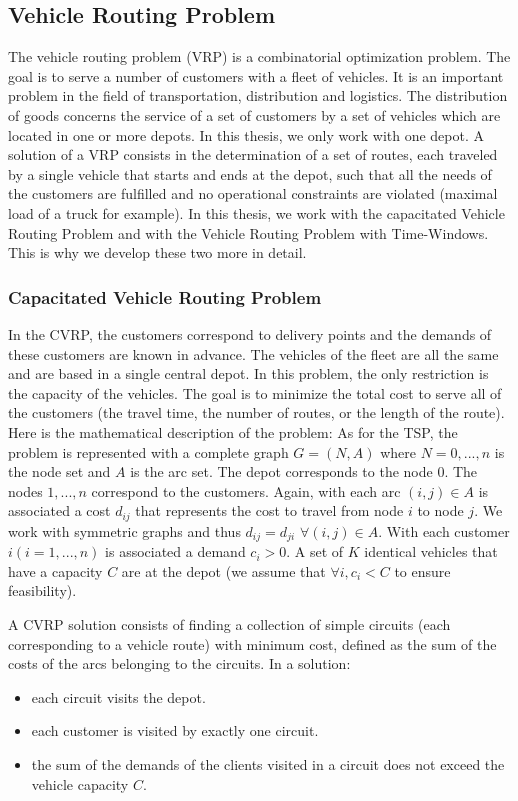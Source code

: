 \subsection{Vehicle Routing Problem}
The vehicle routing problem (VRP) is a combinatorial optimization problem. The goal is to serve a number of customers with a fleet of vehicles. It is an important problem in the field of transportation, distribution and logistics.
The distribution of goods concerns the service of a set of customers by a set of vehicles which are located in one or more depots. In this thesis, we only work with one depot. A solution of a VRP consists in the determination of a set of routes, each traveled by a single vehicle that starts and ends at the depot, such that all the needs of the customers are fulfilled and no operational constraints are violated (maximal load of a truck for example).
In this thesis, we work with the capacitated Vehicle Routing Problem and with the Vehicle Routing Problem with Time-Windows. This is why we develop these two more in detail.

\subsubsection{Capacitated Vehicle Routing Problem}
In the CVRP, the customers correspond to delivery points and the demands of these customers are known in advance. The vehicles of the fleet are all the same and are based in a single central depot. In this problem, the only restriction is the capacity of the vehicles. The goal is to minimize the total cost to serve all of the customers (the travel time, the number of routes, or the length of the route).
Here is the mathematical description of the problem: 
As for the TSP, the problem is represented with a complete graph $G=(N,A)$ where $N = {0,...,n}$ is the node set and $A$ is the arc set. The depot corresponds to the node $0$. The nodes $1,...,n$ correspond to the customers.
Again, with each arc $(i,j) \in A$ is associated a cost $d_{ij}$ that represents the cost to travel from node $i$ to node $j$. We work with symmetric graphs and thus $d_{ij} = d_{ji}$ $\forall (i,j) \in A$.
With each customer $i (i = 1,...,n)$ is associated a demand $c_i > 0$. A set of $K$ identical vehicles that have a capacity $C$ are at the depot (we assume that $\forall i, c_i < C$ to ensure feasibility).

A CVRP solution consists of finding a collection of simple circuits (each corresponding to a vehicle route) with minimum cost, defined as the sum of the costs of the arcs belonging to the circuits. In a solution:
\begin{itemize}
	\item each circuit visits the depot.
	\item each customer is visited by exactly one circuit.
	\item the sum of the demands of the clients visited in a circuit does not exceed the vehicle capacity $C$.
\end{itemize}

